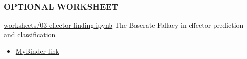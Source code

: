 \begin{frame}
  \frametitle{OPTIONAL WORKSHEET}
  \begin{alertblock}{\url{worksheets/03-effector-finding.ipynb}}
    The Baserate Fallacy in effector prediction and classification.
  \end{alertblock}
  \begin{itemize}
    \item \textcolor{hutton_purple}{\href{http://mybinder.org/repo/widdowquinn/Teaching-EMBL-Plant-Path-Genomics}{MyBinder link}}
  \end{itemize}
\end{frame}